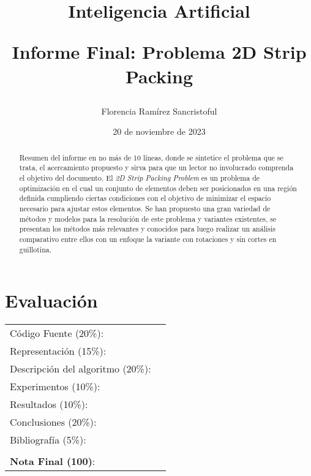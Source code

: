 \documentclass[letter, 10pt]{article}
\begin{document}
\title{Inteligencia Artificial \\ \begin{Large}Informe Final: Problema 2D Strip Packing\end{Large}}
\author{Florencia Ram\'irez Sancristoful}
\date{20 de noviembre de 2023}
\maketitle


\section*{Evaluaci\'on}

\begin{tabular}{ll}
C\'odigo Fuente (20\%): &  \underline{\hspace{2cm}}\\
Representaci\'on (15\%):  & \underline{\hspace{2cm}} \\
Descripci\'on del algoritmo (20\%):  & \underline{\hspace{2cm}} \\
Experimentos (10\%):  & \underline{\hspace{2cm}} \\
Resultados (10\%):  & \underline{\hspace{2cm}} \\
Conclusiones (20\%): &  \underline{\hspace{2cm}}\\
Bibliograf\'ia (5\%): & \underline{\hspace{2cm}}\\
 &  \\
\textbf{Nota Final (100)}:   & \underline{\hspace{2cm}}
\end{tabular}

\vspace{0.6cm}


\begin{abstract}
    Resumen del informe en no m\'as de 10 l\'ineas, donde se sintetice el problema que se trata, el acercamiento propuesto y sirva para que un lector no involucrado comprenda el objetivo del documento.
    \vspace{0.2cm}    
    El \emph{2D Strip Packing Problem} es un problema de optimizaci\'on en el cual un conjunto de elementos deben ser posicionados en una regi\'on definida cumpliendo ciertas condiciones con el objetivo de minimizar el espacio necesario para ajustar estos elementos. Se han propuesto una gran variedad de m\'etodos y modelos para la resoluci\'on de este problema y variantes existentes, se presentan los m\'etodos m\'as relevantes y conocidos para luego realizar un an\'alisis comparativo entre ellos con un enfoque la variante con rotaciones y sin cortes en guillotina.

\end{abstract}
\end{document}
